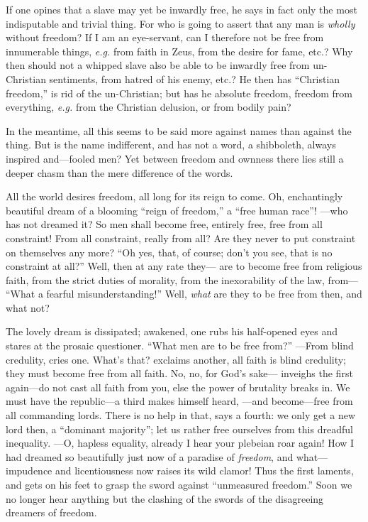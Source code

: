 If one opines that a slave may yet be inwardly free, he says in fact only the 
most indisputable and trivial thing. For who is going to assert that any man 
is \textit{wholly} without freedom? If I am an eye-servant, can I therefore 
not be free from innumerable things, \textit{e.g.} from faith in Zeus, from 
the desire for fame, etc.? Why then should not a whipped slave also be able to 
be inwardly free from un-Christian sentiments, from hatred of his enemy, etc.? 
He then has ``Christian freedom,'' is rid of the un-Christian; but has he 
absolute freedom, freedom from everything, \textit{e.g.} from the Christian 
delusion, or from bodily pain?

In the meantime, all this seems to be said more against names than against the 
thing. But is the name indifferent, and has not a word, a shibboleth, always 
inspired and---fooled men? Yet between freedom and ownness there lies still a 
deeper chasm than the mere difference of the words.

All the world desires freedom, all long for its reign to come. Oh, 
enchantingly beautiful dream of a blooming ``reign of freedom,'' a ``free 
human race''! ---who has not dreamed it? So men shall become free, entirely 
free, free from all constraint! From all constraint, really from all? Are they 
never to put constraint on themselves any more? ``Oh yes, that, of course; 
don't you see, that is no constraint at all?'' Well, then at any rate they--- 
are to become free from religious faith, from the strict duties of morality, 
from the inexorability of the law, from--- ``What a fearful 
misunderstanding!'' Well, \textit{what} are they to be free from then, and 
what not?

The lovely dream is dissipated; awakened, one rubs his half-opened eyes and 
stares at the prosaic questioner. ``What men are to be free from?'' ---From 
blind credulity, cries one. What's that? exclaims another, all faith is blind 
credulity; they must become free from all faith. No, no, for God's sake--- 
inveighs the first again---do not cast all faith from you, else the power of 
brutality breaks in. We must have the republic---a third makes himself heard, ---and become---free from all commanding lords. There is no help in that, 
says a fourth: we only get a new lord then, a ``dominant majority''; let us 
rather free ourselves from this dreadful inequality. ---O, hapless equality, 
already I hear your plebeian roar again! How I had dreamed so beautifully just 
now of a paradise of \textit{freedom}, and what---impudence and 
licentiousness now raises its wild clamor! Thus the first laments, and gets on 
his feet to grasp the sword against ``unmeasured freedom.'' Soon we no 
longer hear anything but the clashing of the swords of the disagreeing 
dreamers of freedom.

